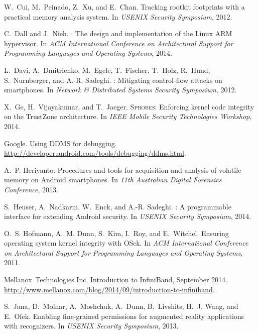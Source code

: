 \documentclass[pageno]{sig-alternate-05-2015}
\begin{document}
\begin{thebibliography}{10}
W.~Cui, M.~Peinado, Z.~Xu, and E.~Chan.
\newblock Tracking rootkit footprints with a practical memory analysis system.
\newblock In {\em USENIX Security Symposium}, 2012.

C.~Dall and J.~Nieh.
: The design and implementation of the {Linux} {ARM}
  hypervisor.
\newblock In {\em ACM International Conference on Architectural Support for
  Programming Languages and Operating Systems}, 2014.

L.~Davi, A.~Dmitrienko, M.~Egele, T.~Fischer, T.~Holz, R.~Hund, S.~Nurnberger,
  and A.-R. Sadeghi.
: {Mitigating} control-flow attacks on smartphones.
\newblock In {\em Network \& Distributed Systems Security Symposium}, 2012.

X.~Ge, H.~Vijayakumar, and T.~Jaeger.
\newblock \textsc{Sprobes}: {Enforcing} kernel code integrity on the
  {TrustZone} architecture.
\newblock In {\em IEEE Mobile Security Technologies Workshop}, 2014.

Google.
\newblock Using {DDMS} for debugging.
\newblock \url{http://developer.android.com/tools/debugging/ddms.html}.

A.~P. Heriyanto.
\newblock Procedures and tools for acquisition and analysis of volatile memory
  on {Android} smartphones.
\newblock In {\em 11th Australian Digital Forensics Conference}, 2013.

S.~Heuser, A.~Nadkarni, W.~Enck, and A.-R. Sadeghi.
: {A} programmable interface for extending {Android} security.
\newblock In {\em USENIX Security Symposium}, 2014.

O.~S. Hofmann, A.~M. Dunn, S.~Kim, I.~Roy, and E.~Witchel.
\newblock Ensuring operating system kernel integrity with {OSck}.
\newblock In {\em ACM International Conference on Architectural Support for
  Programming Languages and Operating Systems}, 2011.

Mellanox~Technologies {Inc.}
\newblock Introduction to {InfiniBand}, September 2014.
\newblock
  \url{http://www.mellanox.com/blog/2014/09/introduction-to-infiniband}.

S.~Jana, D.~Molnar, A.~Moshchuk, A.~Dunn, B.~Livshits, H.~J. Wang, and E.~Ofek.
\newblock Enabling fine-grained permissions for augmented reality applications
  with recognizers.
\newblock In {\em USENIX Security Symposium}, 2013.


\end{thebibliography}
\end{document}
